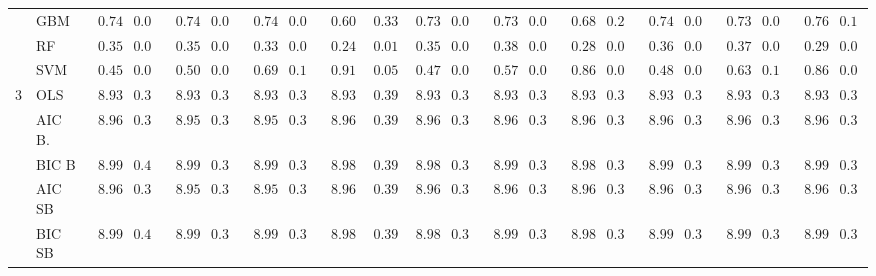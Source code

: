 \begin{tabular}{ll|ll|llllll|llllll|llllll}
	& GBM  & $\phantom{0}0.74$ & $0.04$ & $\phantom{0}0.74$ & $0.04$ & $\phantom{0}0.74$ & $0.04$ & $\phantom{0}0.60$ & $\phantom{0}0.33$ & $\phantom{0}0.73$ & $0.04$ & $\phantom{0}0.73$ & $0.05$ & $\phantom{0}0.68$ & $0.27$ & $\phantom{0}0.74$ & $0.04$ & $\phantom{0}0.73$ & $0.04$ & $\phantom{0}0.76$ & $0.14$ \\
	& RF  & $\phantom{0}0.35$ & $0.01$ & $\phantom{0}0.35$ & $0.01$ & $\phantom{0}0.33$ & $0.01$ & $\phantom{0}0.24$ & $\phantom{0}0.01$ & $\phantom{0}0.35$ & $0.02$ & $\phantom{0}0.38$ & $0.01$ & $\phantom{0}0.28$ & $0.01$ & $\phantom{0}0.36$ & $0.01$ & $\phantom{0}0.37$ & $0.02$ & $\phantom{0}0.29$ & $0.01$ \\
	& SVM  & $\phantom{0}0.45$ & $0.03$ & $\phantom{0}0.50$ & $0.05$ & $\phantom{0}0.69$ & $0.11$ & $\phantom{0}0.91$ & $\phantom{0}0.05$ & $\phantom{0}0.47$ & $0.06$ & $\phantom{0}0.57$ & $0.08$ & $\phantom{0}0.86$ & $0.06$ & $\phantom{0}0.48$ & $0.03$ & $\phantom{0}0.63$ & $0.10$ & $\phantom{0}0.86$ & $0.06$ \\\hline
	3 & OLS  & $\phantom{0}8.93$ & $0.39$ & $\phantom{0}8.93$ & $0.39$ & $\phantom{0}8.93$ & $0.39$ & $\phantom{0}8.93$ & $\phantom{0}0.39$ & $\phantom{0}8.93$ & $0.39$ & $\phantom{0}8.93$ & $0.39$ & $\phantom{0}8.93$ & $0.39$ & $\phantom{0}8.93$ & $0.39$ & $\phantom{0}8.93$ & $0.39$ & $\phantom{0}8.93$ & $0.39$ \\
	& AIC B.  & $\phantom{0}8.96$ & $0.39$ & $\phantom{0}8.95$ & $0.39$ & $\phantom{0}8.95$ & $0.39$ & $\phantom{0}8.96$ & $\phantom{0}0.39$ & $\phantom{0}8.96$ & $0.39$ & $\phantom{0}8.96$ & $0.39$ & $\phantom{0}8.96$ & $0.39$ & $\phantom{0}8.96$ & $0.39$ & $\phantom{0}8.96$ & $0.39$ & $\phantom{0}8.96$ & $0.39$ \\
	& BIC B  & $\phantom{0}8.99$ & $0.40$ & $\phantom{0}8.99$ & $0.39$ & $\phantom{0}8.99$ & $0.39$ & $\phantom{0}8.98$ & $\phantom{0}0.39$ & $\phantom{0}8.98$ & $0.39$ & $\phantom{0}8.99$ & $0.39$ & $\phantom{0}8.98$ & $0.39$ & $\phantom{0}8.99$ & $0.39$ & $\phantom{0}8.99$ & $0.39$ & $\phantom{0}8.99$ & $0.39$ \\
	& AIC SB  & $\phantom{0}8.96$ & $0.39$ & $\phantom{0}8.95$ & $0.39$ & $\phantom{0}8.95$ & $0.39$ & $\phantom{0}8.96$ & $\phantom{0}0.39$ & $\phantom{0}8.96$ & $0.39$ & $\phantom{0}8.96$ & $0.39$ & $\phantom{0}8.96$ & $0.39$ & $\phantom{0}8.96$ & $0.39$ & $\phantom{0}8.96$ & $0.39$ & $\phantom{0}8.96$ & $0.39$ \\
	& BIC SB  & $\phantom{0}8.99$ & $0.40$ & $\phantom{0}8.99$ & $0.39$ & $\phantom{0}8.99$ & $0.39$ & $\phantom{0}8.98$ & $\phantom{0}0.39$ & $\phantom{0}8.98$ & $0.39$ & $\phantom{0}8.99$ & $0.39$ & $\phantom{0}8.98$ & $0.39$ & $\phantom{0}8.99$ & $0.39$ & $\phantom{0}8.99$ & $0.39$ & $\phantom{0}8.99$ & $0.39$ \\

\end{tabular}

